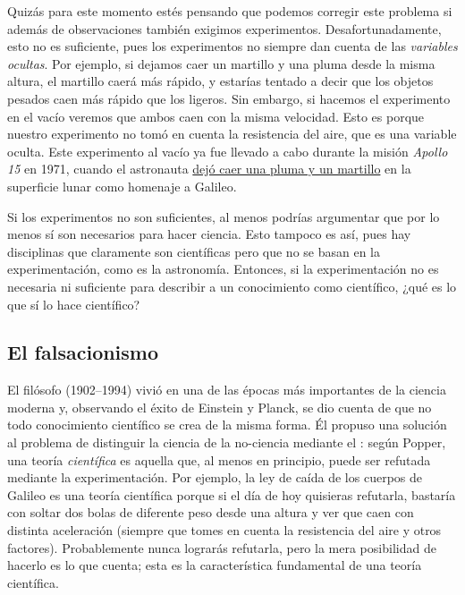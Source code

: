 Quizás para este momento estés pensando que podemos corregir este problema si
además de observaciones también exigimos experimentos.
Desafortunadamente, esto no es suficiente, pues los experimentos no siempre dan
cuenta de las \emph{variables ocultas}.
Por ejemplo, si dejamos caer un martillo y una pluma desde la misma altura, el
martillo caerá más rápido, y estarías tentado a decir que los objetos pesados
caen más rápido que los ligeros.
Sin embargo, si hacemos el experimento en el vacío veremos que ambos caen con
la misma velocidad.
Esto es porque nuestro experimento no tomó en cuenta la resistencia del aire,
que es una variable oculta.
Este experimento al vacío ya fue llevado a cabo durante la misión
\emph{Apollo 15} en 1971, cuando el astronauta 
\href{https://youtu.be/Oo8TaPVsn9Y}{ dejó caer una pluma y un martillo} en la
superficie lunar como homenaje a Galileo.

Si los experimentos no son suficientes, al menos podrías argumentar que por lo
menos sí son necesarios para hacer ciencia.
Esto tampoco es así, pues hay disciplinas que claramente son científicas pero
que no se basan en la experimentación, como es la astronomía.
Entonces, si la experimentación no es necesaria ni suficiente para describir a
un conocimiento como científico, ¿qué es lo que sí lo hace científico?

\subsection*{El falsacionismo}
\label{sub:elfalsacionismo}
El filósofo  (1902--1994) vivió en una de las
épocas más importantes de la ciencia moderna y, observando el éxito de Einstein
y Planck, se dio cuenta de que no todo conocimiento científico se crea de la
misma forma.
Él propuso una solución al problema de distinguir la ciencia de la no-ciencia
mediante el :
según Popper, una teoría \emph{científica} es aquella que, al menos en
principio, puede ser refutada mediante la experimentación.
Por ejemplo, la ley de caída de los cuerpos de Galileo es una teoría científica
porque si el día de hoy quisieras refutarla, bastaría con soltar dos bolas de
diferente peso desde una altura y ver que caen con distinta aceleración (siempre
que tomes en cuenta la resistencia del aire y otros factores).
Probablemente nunca lograrás refutarla, pero la mera posibilidad de hacerlo es
lo que cuenta; esta es la característica fundamental de una teoría científica.

